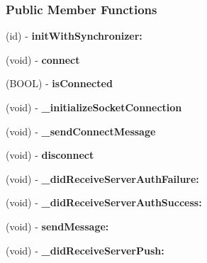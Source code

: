 \subsubsection*{Public Member Functions}
\begin{DoxyCompactItemize}
\item 
\hypertarget{interface_a_t_message_client_ac3819bad54449ea9f46b3d9929bbf435}{
(id) -\/ {\bfseries initWithSynchronizer:}}
\label{interface_a_t_message_client_ac3819bad54449ea9f46b3d9929bbf435}

\item 
\hypertarget{interface_a_t_message_client_a5dc5708c4e13d7a75f78050b5f15249c}{
(void) -\/ {\bfseries connect}}
\label{interface_a_t_message_client_a5dc5708c4e13d7a75f78050b5f15249c}

\item 
\hypertarget{interface_a_t_message_client_ade89bb992bb85887edb8c22f877315e3}{
(BOOL) -\/ {\bfseries isConnected}}
\label{interface_a_t_message_client_ade89bb992bb85887edb8c22f877315e3}

\item 
\hypertarget{interface_a_t_message_client_aaf252625e14f5b125bc246eaa85a0c15}{
(void) -\/ {\bfseries \_\-initializeSocketConnection}}
\label{interface_a_t_message_client_aaf252625e14f5b125bc246eaa85a0c15}

\item 
\hypertarget{interface_a_t_message_client_ac73d19a7651d8e492c9ac97325640e0a}{
(void) -\/ {\bfseries \_\-sendConnectMessage}}
\label{interface_a_t_message_client_ac73d19a7651d8e492c9ac97325640e0a}

\item 
\hypertarget{interface_a_t_message_client_a79c2b59c186f18881680ab4fc1f277d1}{
(void) -\/ {\bfseries disconnect}}
\label{interface_a_t_message_client_a79c2b59c186f18881680ab4fc1f277d1}

\item 
\hypertarget{interface_a_t_message_client_a23c6f5dbb5a6358341d1707b91b86911}{
(void) -\/ {\bfseries \_\-didReceiveServerAuthFailure:}}
\label{interface_a_t_message_client_a23c6f5dbb5a6358341d1707b91b86911}

\item 
\hypertarget{interface_a_t_message_client_a2b1b29a59e25f19e2395b8cd51cf4c26}{
(void) -\/ {\bfseries \_\-didReceiveServerAuthSuccess:}}
\label{interface_a_t_message_client_a2b1b29a59e25f19e2395b8cd51cf4c26}

\item 
\hypertarget{interface_a_t_message_client_a03ec182577d528bc36c8999ea7e5b074}{
(void) -\/ {\bfseries sendMessage:}}
\label{interface_a_t_message_client_a03ec182577d528bc36c8999ea7e5b074}

\item 
\hypertarget{interface_a_t_message_client_a8e98344567ab31d6976978d5ccc172bd}{
(void) -\/ {\bfseries \_\-didReceiveServerPush:}}
\label{interface_a_t_message_client_a8e98344567ab31d6976978d5ccc172bd}

\end{DoxyCompactItemize}
